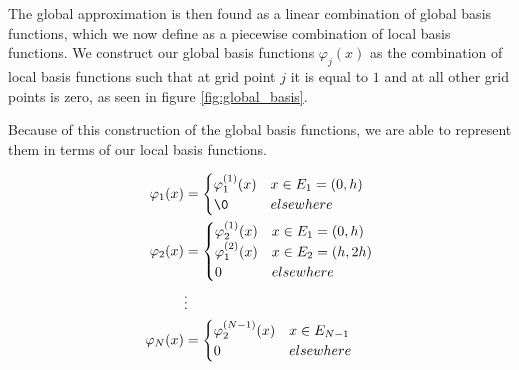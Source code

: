 \documentclass[10pt]{amsart}
\numberwithin{equation}{section}
\newenvironment{Figure}
{\par\medskip\noindent\minipage{\linewidth}}
{\endminipage\par\medskip}
\theoremstyle{definition}
\begin{document}
\begin{multicols}{2}
  The global approximation is then found as a linear combination
  of global basis functions, which we now define as a piecewise combination of
  local basis functions. We construct our global basis functions $\varphi_j(x)$
  as the combination of local basis functions such that at grid point $j$ it is
  equal to $1$ and at all other grid points is zero, as seen in figure
  \ref{fig:global_basis}.

  \begin{Figure}
    \begin{center}
  \end{center}
  \label{fig:global_basis}
\end{Figure}

Because of this construction of the global basis functions, we are able to
represent them in terms of our local basis functions.

\begin{align*}
  \varphi_1(x)&=\begin{cases}
    \varphi_1^{(1)}(x) & x\in E_1=(0,h)\\
    \0 & elsewhere
  \end{cases}\\
  \varphi_2(x)&=\begin{cases}
    \varphi_2^{(1)}(x) & x\in E_1=(0,h)\\
    \varphi_1^{(2)}(x) & x\in E_2=(h,2h)\\
    0 & elsewhere
  \end{cases}\\
              &\vdots\\
  \varphi_N(x)&=\begin{cases}
    \varphi_2^{(N-1)}(x) & x\in E_{N-1}\\
    0 & elsewhere
  \end{cases}
\end{align*}


\end{multicols}
\end{document}
